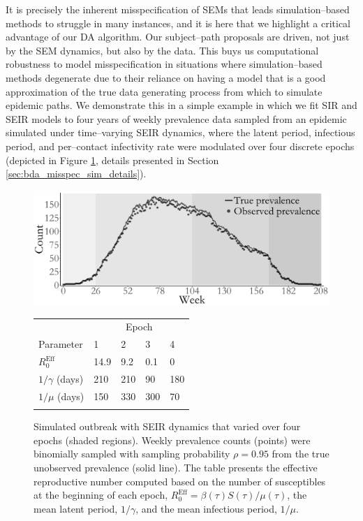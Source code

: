 It is precisely the inherent misspecification of SEMs that leads simulation--based methods to struggle in many instances, and it is here that we highlight a critical advantage of our DA algorithm. Our subject--path proposals are driven, not just by the SEM dynamics, but also by the data. This buys us computational robustness to model misspecification in situations where simulation--based methods degenerate due to their reliance on having a model that is a good approximation of the true data generating process from which to simulate epidemic paths. We demonstrate this in a simple example in which we fit SIR and SEIR models to four years of weekly prevalence data sampled from an epidemic simulated under time--varying SEIR dynamics, where the latent period, infectious period, and per--contact infectivity rate were modulated over four discrete epochs (depicted in Figure \ref{fig:misspec_data}, details presented in Section \ref{sec:bda_misspec_sim_details}).

\setcounter{table}{1}
\begin{figure}[!ht]
	\centering
	\includegraphics[width=0.5\linewidth]{figures/SEIR_misspec_data.pdf}
	\qquad
	\begin{tabular}[b]{lllll}
		& \multicolumn{4}{c}{Epoch}\\ \cmidrule{2-5}
		Parameter & 1 & 2 & 3 & 4 \\ \hline	
		$ R_0^{\mathrm{Eff}} $ & 14.9& 9.2& 0.1& 0\\
		$ 1/\gamma $ (days) & 210&210&90& 180\\
		$ 1/\mu $ (days) & 150 &330&300&70	\\
		&&&&
	\end{tabular}
	\captionsetup{labelformat=andtable}
	\caption[Simulated outbreak data from an SEIR model with time--varying dynamics.]{Simulated outbreak with SEIR dynamics that varied over four epochs (shaded regions). Weekly prevalence counts (points) were binomially sampled with sampling probability $ \rho = 0.95 $ from the true unobserved prevalence (solid line). The table presents the effective reproductive number computed based on the number of susceptibles at the beginning of each epoch, $ R_0^{\mathrm{Eff}} = \beta(\tau) S(\tau) / \mu(\tau) $, the mean latent period, $ 1/\gamma $, and the mean infectious period, $ 1/\mu $.}
	\label{fig:misspec_data}
\end{figure}

